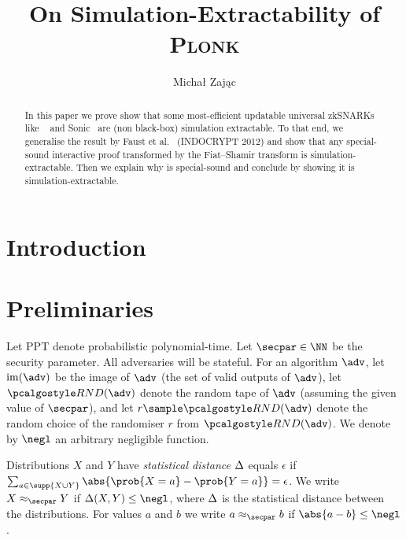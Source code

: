 \documentclass[runningheads]{llncs}
\title{On Simulation-Extractability of \textsc{Plonk}}
\author{Michał Zając}
\institute{Clearmatics, London, UK\\ \email{m.p.zajac@gmail.com}}
\theoremstyle{definition}
\begin{document}
	\sloppy
	\maketitle

\begin{abstract}
	
	In this paper we prove show that some most-efficient updatable universal zkSNARKs like \plonk{}~\cite{EPRINT:GabWilCio19} and Sonic~\cite{CCS:MBKM19} are (non black-box) simulation extractable. 
	To that end, we generalise the result by Faust et al.~\cite{INDOCRYPT:FKMV12} (INDOCRYPT 2012) and show that any special-sound interactive proof transformed by the Fiat--Shamir transform is simulation-extractable. Then we explain why \plonk{} is special-sound and conclude by showing it is simulation-extractable.
\end{abstract}

\section{Introduction}

\section{Preliminaries}
Let PPT denote probabilistic polynomial-time.
Let $\secpar \in \NN$ be the security parameter.
All adversaries will be stateful.
For an algorithm $\adv$, let $\IM (\adv)$ be the image of $\adv$ (the set of valid outputs of $\adv$), let $\RND{\adv}$ denote the random tape of $\adv$ (assuming the given value of $\secpar$), and let $r \sample \RND{\adv}$ denote the random choice of the randomiser $r$ from $\RND{\adv}$.
We denote by $\negl$ an arbitrary negligible function.

Distributions $X$ and $Y$ have \emph{statistical distance} $\Delta$ equals $\epsilon$ if $\sum_{a \in \supp{X \cup Y}} \abs{\prob{X = a} - \prob{Y = a}} = \epsilon$.
We write $X \approx_\secpar Y$ if $\SD(X, Y) \leq \negl$, where $\Delta$ is the statistical distance between the distributions.
For values $a$ and $b$ we write $a \approx_\secpar b$ if $\abs{a - b} \leq \negl$. 
\end{document}
